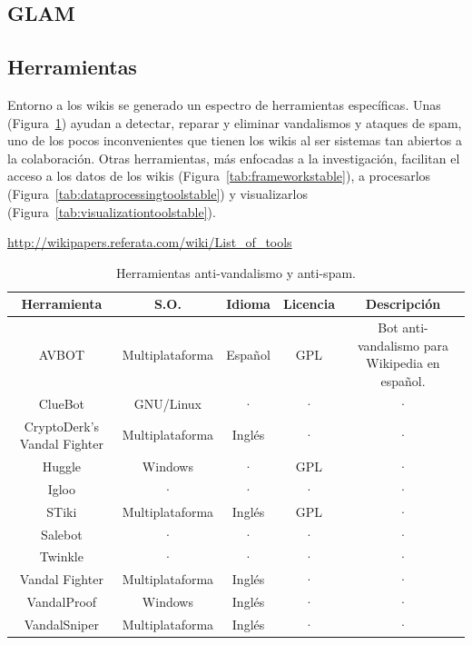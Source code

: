 \documentclass[11pt,onecolumn]{article}
\begin{document}
\subsection{GLAM}







\subsection{Herramientas}


Entorno a los wikis se generado un espectro de herramientas específicas. Unas (Figura~\ref{tab:vandaltoolstable}) ayudan a detectar, reparar y eliminar vandalismos y ataques de spam, uno de los pocos inconvenientes que tienen los wikis al ser sistemas tan abiertos a la colaboración. Otras herramientas, más enfocadas a la investigación, facilitan el acceso a los datos de los wikis (Figura~\ref{tab:frameworkstable}), a procesarlos (Figura~\ref{tab:dataprocessingtoolstable}) y visualizarlos (Figura~\ref{tab:visualizationtoolstable}).

\href{http://wikipapers.referata.com/wiki/List_of_tools}{http://wikipapers.referata.com/wiki/List\_of\_tools}

\begin{table}
\centering
\begin{tabular}{| c | c | c | c | c |}
\hline
\textbf{Herramienta} & \textbf{S.O.} & \textbf{Idioma} & \textbf{Licencia} & \textbf{Descripción} \\
\hline
AVBOT & Multiplataforma & Español & GPL & Bot anti-vandalismo para Wikipedia en español. \\ \hline
ClueBot & GNU/Linux & · & · & · \\ \hline
CryptoDerk's Vandal Fighter & Multiplataforma & Inglés & · & · \\ \hline
Huggle & Windows & · & GPL & · \\ \hline
Igloo & · & · & · & · \\ \hline
STiki & Multiplataforma & Inglés & GPL & · \\ \hline
Salebot & · & · & · & · \\ \hline
Twinkle & · & · & · & · \\ \hline
Vandal Fighter & Multiplataforma & Inglés & · & · \\ \hline
VandalProof & Windows & Inglés & · & · \\ \hline
VandalSniper & Multiplataforma & Inglés & · & · \\ \hline
\end{tabular}
\caption{Herramientas anti-vandalismo y anti-spam.}
\label{tab:vandaltoolstable}
\end{table}
\end{document}
